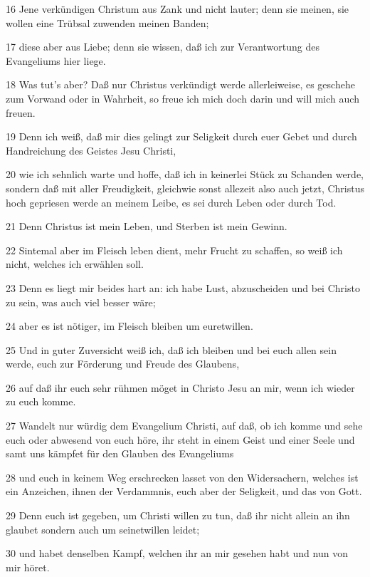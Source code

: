 \par 16 Jene verkündigen Christum aus Zank und nicht lauter; denn sie meinen, sie wollen eine Trübsal zuwenden meinen Banden;
\par 17 diese aber aus Liebe; denn sie wissen, daß ich zur Verantwortung des Evangeliums hier liege.
\par 18 Was tut's aber? Daß nur Christus verkündigt werde allerleiweise, es geschehe zum Vorwand oder in Wahrheit, so freue ich mich doch darin und will mich auch freuen.
\par 19 Denn ich weiß, daß mir dies gelingt zur Seligkeit durch euer Gebet und durch Handreichung des Geistes Jesu Christi,
\par 20 wie ich sehnlich warte und hoffe, daß ich in keinerlei Stück zu Schanden werde, sondern daß mit aller Freudigkeit, gleichwie sonst allezeit also auch jetzt, Christus hoch gepriesen werde an meinem Leibe, es sei durch Leben oder durch Tod.
\par 21 Denn Christus ist mein Leben, und Sterben ist mein Gewinn.
\par 22 Sintemal aber im Fleisch leben dient, mehr Frucht zu schaffen, so weiß ich nicht, welches ich erwählen soll.
\par 23 Denn es liegt mir beides hart an: ich habe Lust, abzuscheiden und bei Christo zu sein, was auch viel besser wäre;
\par 24 aber es ist nötiger, im Fleisch bleiben um euretwillen.
\par 25 Und in guter Zuversicht weiß ich, daß ich bleiben und bei euch allen sein werde, euch zur Förderung und Freude des Glaubens,
\par 26 auf daß ihr euch sehr rühmen möget in Christo Jesu an mir, wenn ich wieder zu euch komme.
\par 27 Wandelt nur würdig dem Evangelium Christi, auf daß, ob ich komme und sehe euch oder abwesend von euch höre, ihr steht in einem Geist und einer Seele und samt uns kämpfet für den Glauben des Evangeliums
\par 28 und euch in keinem Weg erschrecken lasset von den Widersachern, welches ist ein Anzeichen, ihnen der Verdammnis, euch aber der Seligkeit, und das von Gott.
\par 29 Denn euch ist gegeben, um Christi willen zu tun, daß ihr nicht allein an ihn glaubet sondern auch um seinetwillen leidet;
\par 30 und habet denselben Kampf, welchen ihr an mir gesehen habt und nun von mir höret.

